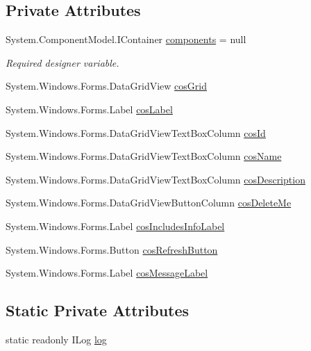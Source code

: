 \subsection*{Private Attributes}
\begin{DoxyCompactItemize}
\item 
System.ComponentModel.IContainer \hyperlink{class_ias_pbx_config_1_1_classes_of_service_aec5a05c9db08d37a3f6925314fedbe7d}{components} = null
\begin{DoxyCompactList}\small\item\em Required designer variable. \item\end{DoxyCompactList}\item 
System.Windows.Forms.DataGridView \hyperlink{class_ias_pbx_config_1_1_classes_of_service_a19d5713eed8f1042f28a0e5ea5ed6071}{cosGrid}
\item 
System.Windows.Forms.Label \hyperlink{class_ias_pbx_config_1_1_classes_of_service_a55b81dc19715763881780e3a83d3128d}{cosLabel}
\item 
System.Windows.Forms.DataGridViewTextBoxColumn \hyperlink{class_ias_pbx_config_1_1_classes_of_service_a6f26462284ed1484ad0fb62dd6c82975}{cosId}
\item 
System.Windows.Forms.DataGridViewTextBoxColumn \hyperlink{class_ias_pbx_config_1_1_classes_of_service_a98321cd95fe0cb558ab4cc16dbed0937}{cosName}
\item 
System.Windows.Forms.DataGridViewTextBoxColumn \hyperlink{class_ias_pbx_config_1_1_classes_of_service_a8a81e78ec29741481d934d0804f6322c}{cosDescription}
\item 
System.Windows.Forms.DataGridViewButtonColumn \hyperlink{class_ias_pbx_config_1_1_classes_of_service_a213011b8964d3c83228bc86b511ef6ab}{cosDeleteMe}
\item 
System.Windows.Forms.Label \hyperlink{class_ias_pbx_config_1_1_classes_of_service_abfacee229a02347e3b82a912d417ede2}{cosIncludesInfoLabel}
\item 
System.Windows.Forms.Button \hyperlink{class_ias_pbx_config_1_1_classes_of_service_a55630abdbdee23747de3d654e8beecaf}{cosRefreshButton}
\item 
System.Windows.Forms.Label \hyperlink{class_ias_pbx_config_1_1_classes_of_service_a4b9654ea6da7c2e26c008eab8658f3cb}{cosMessageLabel}
\end{DoxyCompactItemize}
\subsection*{Static Private Attributes}
\begin{DoxyCompactItemize}
\item 
static readonly ILog \hyperlink{class_ias_pbx_config_1_1_classes_of_service_a0e880fa24b3e6353d0f88de7f293612e}{log}
\end{DoxyCompactItemize}


